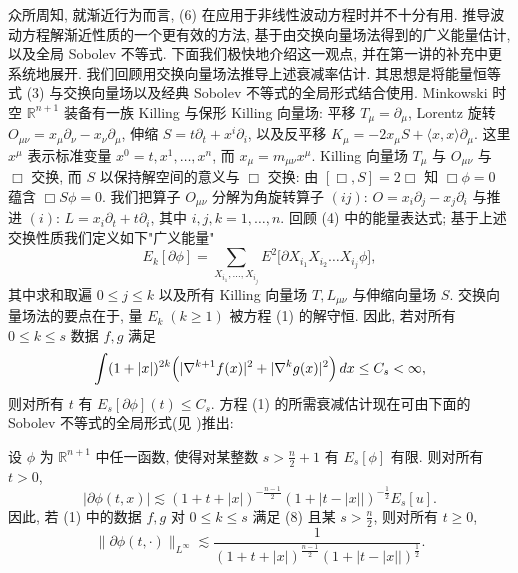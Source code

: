 众所周知, 就渐近行为而言, (6) 在应用于非线性波动方程时并不十分有用. 推导波动方程解渐近性质的一个更有效的方法, 基于由交换向量场法得到的广义能量估计, 以及全局 Sobolev 不等式. 下面我们极快地介绍这一观点, 并在第一讲的补充中更系统地展开. 我们回顾用交换向量场法推导上述衰减率估计. 其思想是将能量恒等式 (3) 与交换向量场以及经典 Sobolev 不等式的全局形式结合使用.
Minkowski 时空 $\mathbb{R}^{n+1}$ 装备有一族 Killing 与保形 Killing 向量场: 平移 $T_{\mu} = \partial_{\mu}$, Lorentz 旋转 $O_{\mu\nu} = x_{\mu} \partial_{\nu} - x_{\nu} \partial_{\mu}$, 伸缩 $S = t \partial_{t} + x^{i} \partial_{i}$, 以及反平移 $K_{\mu} = -2x_{\mu}S + \langle x, x\rangle \partial_{\mu}$. 这里 $x^{\mu}$ 表示标准变量 $x^{0} = t, x^{1}, \ldots, x^{n}$, 而 $x_{\mu} = m_{\mu\nu} x^{\mu}$. Killing 向量场 $T_{\mu}$ 与 $O_{\mu\nu}$ 与 $\Box$ 交换, 而 $S$ 以保持解空间的意义与 $\Box$ 交换: 由 $[\Box, S] = 2\Box$ 知 $\Box \phi = 0$ 蕴含 $\Box S \phi = 0$. 我们把算子 $O_{\mu\nu}$ 分解为角旋转算子 $(ij)$: $O = x_{i} \partial_{j} - x_{j} \partial_{i}$ 与推进 $(i)$: $L = x_{i} \partial_{t} + t \partial_{i}$, 其中 $i, j, k = 1, \ldots, n$. 回顾 (4) 中的能量表达式; 基于上述交换性质我们定义如下"广义能量"
\begin{equation}
E_{k}[\partial\phi]=\sum_{X_{i_{1}},\ldots,X_{i_{j}}}E^{2}\bigl[\partial X_{i_{1}}X_{i_{2}}\ldots X_{i_{j}}\phi\bigr],\end{equation}
其中求和取遍 $0 \leq j \leq k$ 以及所有 Killing 向量场 $T, L_{\mu\nu}$ 与伸缩向量场 $S$. 交换向量场法的要点在于, 量 $E_k\;(k \geq 1)$ 被方程 (1) 的解守恒. 因此, 若对所有 $0 \leq k \leq s$ 数据 $f, g$ 满足
\begin{equation}
\int(1+|x|)^{2k}\Bigl(|\nabla^{k+1}f(x)|^{2}+|\nabla^{k} g(x)|^{2}\Bigr)\,d x\leq C_{s}<\infty,\end{equation}
则对所有 $t$ 有 $E_s[\partial\phi](t) \leq C_s$. 方程 (1) 的所需衰减估计现在可由下面的 Sobolev 不等式的全局形式(见 \cite{klai27})推出:
\begin{proposition}\label{prop:1.6}
设 $\phi$ 为 $\mathbb{R}^{n+1}$ 中任一函数, 使得对某整数 $s > \frac{n}{2} + 1$ 有 $E_s[\phi]$ 有限. 则对所有 $t > 0$,
\begin{equation}
|\partial\phi(t,x)|\lesssim(1+t+|x|)^{-\frac{n-1}{2}}(1+|t-|x||)^{-\frac{1}{2}}E_{s}[u].\end{equation}
因此, 若 (1) 中的数据 $f, g$ 对 $0 \leq k \leq s$ 满足 (8) 且某 $s > \frac{n}{2}$, 则对所有 $t \geq 0$,
\begin{equation}
\|\partial\phi(t,\cdot)\|_{L^{\infty}}\lesssim\frac{1}{(1+t+|x|)^{\frac{n-1}{2}}(1+|t-|x||)^{\frac{1}{2}}}.\end{equation}
\end{proposition}

